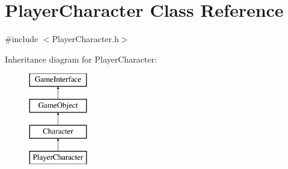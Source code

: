 \hypertarget{class_player_character}{\section{Player\-Character Class Reference}
\label{class_player_character}
}


{\ttfamily \#include $<$Player\-Character.\-h$>$}

Inheritance diagram for Player\-Character\-:\begin{figure}[H]
\begin{center}
\leavevmode
\includegraphics[height=4.000000cm]{class_player_character}
\end{center}
\end{figure}

